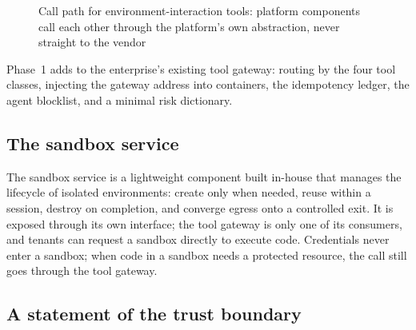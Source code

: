 \begin{figure}[htbp]
\centering
{}
\caption[Call path for environment tools]{Call path for environment-interaction tools: platform components call each other through the platform's own abstraction, never straight to the vendor}
\label{fig:tool-chain}
\end{figure}

Phase~1 adds to the enterprise's existing tool gateway: routing by the four tool classes, injecting the gateway address into containers, the idempotency ledger, the agent blocklist, and a minimal risk dictionary.

\subsection{The sandbox service}

The sandbox service is a lightweight component built in-house that manages the lifecycle of isolated environments: create only when needed, reuse within a session, destroy on completion, and converge egress onto a controlled exit. It is exposed through its own  interface; the tool gateway is only one of its consumers, and tenants can request a sandbox directly to execute code. Credentials never enter a sandbox; when code in a sandbox needs a protected resource, the call still goes through the tool gateway.

\subsection{A statement of the trust boundary}

